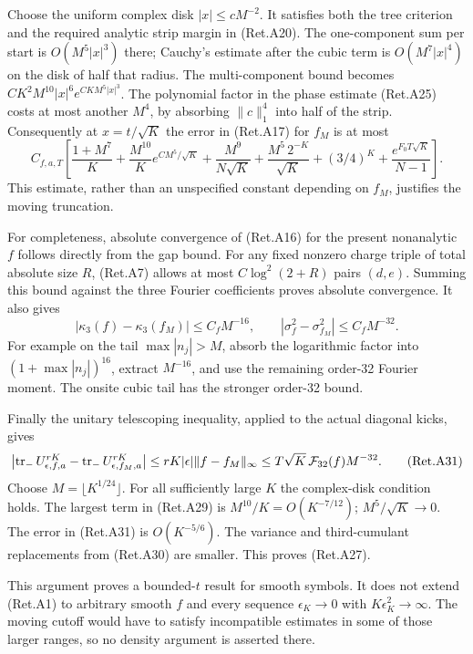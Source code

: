 Choose the uniform complex disk \(|x|\le cM^{-2}\).
It satisfies both the tree criterion and the required analytic
strip margin in (Ret.A20). The one-component sum per start is
\(O(M^5|x|^3)\) there; Cauchy's estimate after the cubic term is
\(O(M^7|x|^4)\) on the disk of half that radius.
The multi-component bound becomes
\(CK^2M^{10}|x|^6e^{CKM^5|x|^3}\).
The polynomial factor in the phase estimate (Ret.A25) costs at most
another \(M^4\), by absorbing \(\|c\|_1^4\) into half of the strip.
Consequently at \(x=t/\sqrt K\) the error in (Ret.A17) for \(f_M\) is at most
\[
 C_{f,a,T}\left[
 \frac{1+M^7}{K}
 +\frac{M^{10}}K e^{CM^5/\sqrt K}
 +\frac{M^9}{N\sqrt K}+\frac{M^5\,2^{-K}}{\sqrt K}
 +(3/4)^K+\frac{e^{F_0T\sqrt K}}{N-1}\right].               \tag{Ret.A29}
\]
This estimate, rather than an unspecified constant depending on \(f_M\),
justifies the moving truncation.

For completeness, absolute convergence of (Ret.A16) for the present
nonanalytic \(f\) follows directly from the gap bound.
For any fixed nonzero charge triple of total absolute size \(R\),
(Ret.A7) allows at most \(C\log^2(2+R)\) pairs \((d,e)\).
Summing this bound against the three Fourier coefficients proves
absolute convergence. It also gives
\[
 |\kappa_3(f)-\kappa_3(f_M)|\le C_f M^{-16},\qquad
 |\sigma_f^2-\sigma_{f_M}^2|\le C_f M^{-32}.                 \tag{Ret.A30}
\]
For example on the tail \(\max|n_j|>M\), absorb the logarithmic
factor into \((1+\max|n_j|)^{16}\), extract \(M^{-16}\), and use
the remaining order-32 Fourier moment. The onsite cubic tail
has the stronger order-32 bound.

Finally the unitary telescoping inequality, applied to the actual
diagonal kicks, gives
\[
 \left|\operatorname{tr}_-U_{\epsilon,f,a}^{rK}
           -\operatorname{tr}_-U_{\epsilon,f_M,a}^{rK}\right|
 \le rK|\epsilon|\|f-f_M\|_\infty
 \le T\sqrt K\,{\cal F}_{32}(f)M^{-32}.                    \tag{Ret.A31}
\]
Choose \(M=\lfloor K^{1/24}\rfloor\).
For all sufficiently large \(K\) the complex-disk condition holds.
The largest term in (Ret.A29) is \(M^{10}/K=O(K^{-7/12})\);
\(M^5/\sqrt K\to0\). The error in (Ret.A31) is \(O(K^{-5/6})\).
The variance and third-cumulant replacements from (Ret.A30) are smaller.
This proves (Ret.A27).

This argument proves a bounded-\(t\) result for smooth symbols.
It does not extend (Ret.A1) to arbitrary smooth \(f\) and every sequence
\(\epsilon_K\to0\) with \(K\epsilon_K^2\to\infty\).
The moving cutoff would have to satisfy incompatible estimates in
some of those larger ranges, so no density argument is asserted there.

